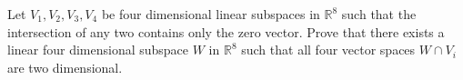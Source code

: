 Let $V_1,V_2,V_3,V_4$ be four dimensional linear subspaces in $\mathbb{R}^8$ such that the intersection of any two contains only the zero vector. Prove that there exists a linear four dimensional subspace $W$ in $\mathbb{R}^8$ such that all four vector spaces $W\cap V_i$ are two dimensional.